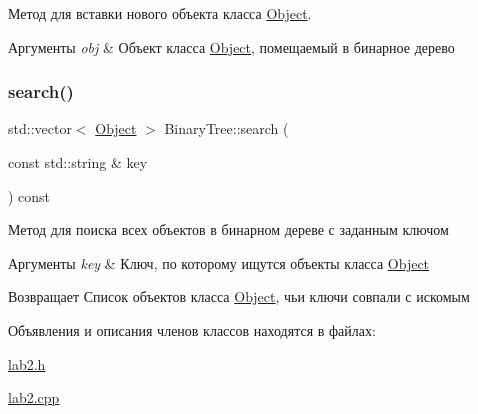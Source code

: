 Метод для вставки нового объекта класса \mbox{\hyperlink{structObject}{Object}}. 


\begin{DoxyParams}{Аргументы}
{\em obj} & Объект класса \mbox{\hyperlink{structObject}{Object}}, помещаемый в бинарное дерево \\
\hline
\end{DoxyParams}
\mbox{\label{classBinaryTree_a15cfc97afa0ee9607b6c216f7e8d5e3c}} 
\subsubsection{\texorpdfstring{search()}{search()}}
{\footnotesize\ttfamily std\+::vector$<$ \mbox{\hyperlink{structObject}{Object}} $>$ Binary\+Tree\+::search (\begin{DoxyParamCaption}\item[{const std\+::string \&}]{key }\end{DoxyParamCaption}) const}



Метод для поиска всех объектов в бинарном дереве с заданным ключом 


\begin{DoxyParams}{Аргументы}
{\em key} & Ключ, по которому ищутся объекты класса \mbox{\hyperlink{structObject}{Object}} \\
\hline
\end{DoxyParams}
\begin{DoxyReturn}{Возвращает}
Список объектов класса \mbox{\hyperlink{structObject}{Object}}, чьи ключи совпали с искомым 
\end{DoxyReturn}


Объявления и описания членов классов находятся в файлах\+:\begin{DoxyCompactItemize}
\item 
\mbox{\hyperlink{lab2_8h}{lab2.\+h}}\item 
\mbox{\hyperlink{lab2_8cpp}{lab2.\+cpp}}\end{DoxyCompactItemize}
